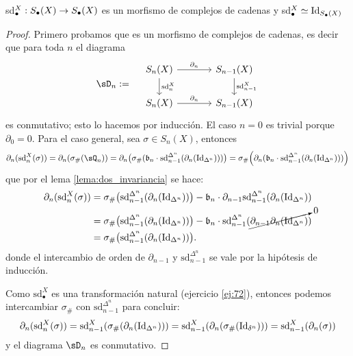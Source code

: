 \documentclass[../../topologia_algebraica]{subfiles}
\begin{document}
\begin{lema}\label{lema:sd_homotopico_identidad}
  sd${}^X_{\bullet}:S_{\bullet}(X)\rightarrow S_{\bullet}(X)$ es un morfismo de complejos de cadenas y
  sd${}^X_{\bullet}\simeq\text{Id}_{S_{\bullet}(X)}$
\end{lema}
\begin{proof}
  Primero probamos que es un morfismo de complejos de cadenas, es decir que para toda $n$
  el diagrama
  \[
    \sD_n:=\quad
    \begin{tikzcd}[column sep=large]
      S_n(X) \arrow[r,"\partial_n"] \arrow[d,"\text{sd}^X_n"] & S_{n-1}(X) \arrow[d,"\text{sd}^X_{n-1}"]\\
      S_n(X) \arrow[r,"\partial_n"] & S_{n-1}(X)
    \end{tikzcd}
  \]
  es conmutativo; esto lo hacemos por inducci\'on. El caso $n=0$ es trivial porque
  $\partial_0=0$. Para el caso general, sea $\sigma\in S_n(X)$, entonces
  \[
    \partial_n(\text{sd}^X_n(\sigma))=
    \partial_n(\sigma_{\#}(\sQ_n))=
    \partial_n\big(\sigma_{\#}(\fb_n\cdot\text{sd}^{\Delta^n}_{n-1}(\partial_n(\Id_{\Delta^n})))\big)=
    \sigma_{\#}\Big( \partial_n(\fb_n\cdot\text{sd}^{\Delta^n}_{n-1}(\partial_n(\Id_{\Delta^n}))) \Big)
  \]
  que por el lema \ref{lema:dos_invariancia} se hace:
  \begin{align*}
    \partial_n(\text{sd}^X_n(\sigma))&=
    \sigma_{\#}\big( \text{sd}^{\Delta^n}_{n-1}(\partial_n(\text{Id}_{\Delta^n})) \big)-
    \mathfrak{b}_n\cdot\partial_{n-1}\text{sd}^{\Delta^n}_{n-1}(\partial_n(\text{Id}_{\Delta^n})) \\ & =
    \sigma_{\#}\big( \text{sd}^{\Delta^n}_{n-1}(\partial_n(\text{Id}_{\Delta^n})) \big)-
    \mathfrak{b}_n\cdot\text{sd}^{\Delta^n}_{n-1}(\cancelto{0}{\partial_{n-1}\partial_n(\text{Id}_{\Delta^n})})\\ & =
     \sigma_{\#}\big( \text{sd}^{\Delta^n}_{n-1}(\partial_n(\text{Id}_{\Delta^n})) \big).
  \end{align*}
  donde el intercambio de orden de $\partial_{n-1}$ y $\text{sd}^{\Delta^n}_{n-1}$ se
  vale por la hip\'otesis de inducci\'on.
  
  Como $\text{sd}^{X}_{\bullet}$ es una transformaci\'on natural (ejercicio \ref{ej:72}),
  entonces podemos intercambiar $\sigma_{\#}$ con $\text{sd}^{\Delta^n}_{n-1}$ para concluir:
  \[
    \partial_n(\text{sd}^{X}_{n}(\sigma))=
    \text{sd}^{X}_{n-1}(\sigma_{\#}(\partial_n(\text{Id}_{\Delta^n})))=
    \text{sd}^X_{n-1}(\partial_n(\sigma_{\#}(\text{Id}_{\delta^n})))=
    \text{sd}^X_{n-1}(\partial_n(\sigma))
  \]
  y el diagrama $\sD_n$ es conmutativo.


\end{proof}
\end{document}

